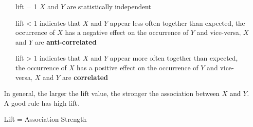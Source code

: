 \documentclass[a4paper, 11pt]{article}
\begin{document}
\begin{itemize}[leftmargin=*, labelindent=3cm, labelsep=1cm]
	\item[lift = 1] $X$ and $Y$ are statistically independent
	\item[lift < 1] indicates that $X$ and $Y$ appear less often together than expected, the occurrence of $X$ has a negative effect on the occurrence of $Y$ and vice-versa, $X$ and $Y$ are \textbf{anti-correlated}
	\item[lift > 1] indicates that $X$ and $Y$ appear more often together than expected, the occurrence of $X$ has a positive effect on the occurrence of $Y$ and vice-versa, $X$ and $Y$ are \textbf{correlated}
\end{itemize}

In general, the larger the lift value, the stronger the association between $X$ and $Y$. A good rule has high lift.

\begin{theorem}
	Lift = Association Strength
\end{theorem}
\end{document}

